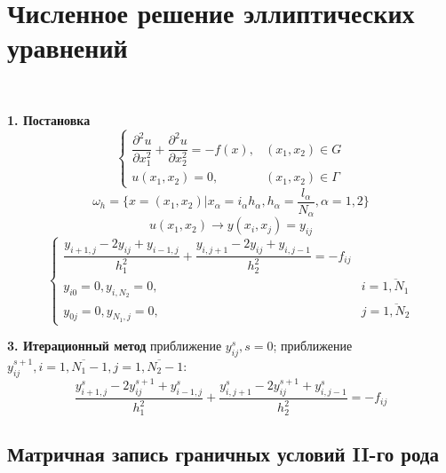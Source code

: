 \documentclass[9pt]{article}
\begin{document}
\section{Численное решение эллиптических уравнений}

\ 
\par\textbf{1. Постановка}
\[\left\{
\begin{array}{ll}
    \dfrac{\partial^2u}{\partial x_1^2}+\dfrac{\partial^2u}{\partial x_2^2}=-f(x), & (x_1,x_2)\in G \\
    u(x_1,x_2)=0, & (x_1,x_2)\in\Gamma
\end{array}\right.\]
\[\omega_h=\{x=(x_1,x_2)|x_\alpha=i_\alpha h_\alpha, h_\alpha=\frac{l_\alpha}{N_\alpha},\alpha=1,2\}\]
\[u(x_1,x_2) \to y(x_i,x_j)=y_{ij}\]
\[\left\{
\begin{array}{ll}
    \dfrac{y_{i+1,j}-2y_{ij}+y_{i-1,j}}{h_1^2}+\dfrac{y_{i,j+1}-2y_{ij}+y_{i,j-1}}{h_2^2}=-f_{ij} &  \\
    y_{i0}=0,y_{i,N_2}=0, & i=\overline{1,N_1} \\
    y_{0j}=0,y_{N_1,j}=0, & j=\overline{1,N_2}
\end{array}\right.\]
\par\textbf{3. Итерационный метод}
 приближение \(y_{ij}^s,s=0\);
 приближение \(y_{ij}^{s+1},i=\overline{1,N_1-1},j=\overline{1,N_2-1}\): 
\[\dfrac{y_{i+1,j}^s-2y_{ij}^{s+1}+y_{i-1,j}^s}{h_1^2}+\dfrac{y_{i,j+1}^s-2y_{ij}^{s+1}+y_{i,j-1}^s}{h_2^2}=-f_{ij}\]

\subsection{Матричная запись граничных условий II-го рода}
\end{document}
